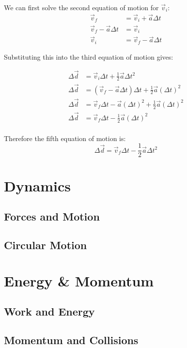 \documentclass{article}
\begin{document}
We can first solve the second equation of motion for $\vec{v}_i$:
\begin{align}
    \vec{v}_f &= \vec{v}_i + \vec{a}\Delta t\\
    \vec{v}_f - \vec{a}\Delta t &= \vec{v}_i \\ 
    \vec{v}_i &= \vec{v}_f - \vec{a}\Delta t
\end{align}

Substituting this into the third equation of motion gives:

\begin{align}
    \Delta \vec{d} &= \vec{v}_i\Delta t + \frac{1}{2}\vec{a}\Delta t^2\\
    \Delta \vec{d} &= (\vec{v}_f - \vec{a}\Delta t)\Delta t + \frac{1}{2}\vec{a}(\Delta t)^2\\
    \Delta \vec{d} &= \vec{v}_f\Delta t - \vec{a}(\Delta t)^2 + \frac{1}{2}\vec{a}(\Delta t)^2\\
    \Delta \vec{d} &= \vec{v}_f\Delta t - \frac{1}{2}\vec{a}(\Delta t)^2\\
\end{align}

Therefore the fifth equation of motion is:
\begin{equation}
    \Delta \vec{d} = \vec{v}_f\Delta t - \frac{1}{2}\vec{a}\Delta t^2
\end{equation}



\section{Dynamics}
\subsection{Forces and Motion}
\subsection{Circular Motion}
\section{Energy \& Momentum}
\subsection{Work and Energy}
\subsection{Momentum and Collisions}
\end{document}
